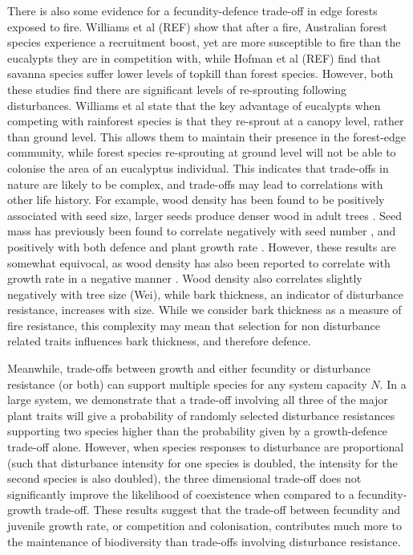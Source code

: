 \documentclass[a4paper]{article}
\begin{document}
There is also some evidence for a fecundity-defence trade-off in edge forests exposed to fire. Williams et al (REF) show that after a fire, Australian forest species experience a recruitment boost, yet are more susceptible to fire than the eucalypts they are in competition with, while Hofman et al (REF) find that savanna species suffer lower levels of topkill than forest species. However, both these studies find there are significant levels of re-sprouting following disturbances. Williams et al state that the key advantage of eucalypts when competing with rainforest species is that they re-sprout at a canopy level, rather than ground level. This allows them to maintain their presence in the forest-edge community, while forest species re-sprouting at ground level will not be able to colonise the area of an eucalyptus individual. This indicates that trade-offs in nature are likely to be complex, and trade-offs may lead to correlations with other life history. For example, wood density has been found to be positively associated with seed size, larger seeds produce denser wood in adult trees \cite{ter2001character}. Seed mass has previously been found to correlate negatively with seed number \citep{turnbull1999seed}, and positively with both defence \citep{niklas1992plant} and plant growth rate \citep{gross1984effects}. However, these results are somewhat equivocal, as wood density has also been reported to correlate with growth rate in a negative manner \citep{king2005tree}. Wood density also correlates slightly negatively with tree size (Wei), while bark thickness, an indicator of disturbance resistance, increases with size. While we consider bark thickness as a measure of fire resistance, this complexity may mean that selection for non disturbance related traits influences bark thickness, and therefore defence. 

Meanwhile, trade-offs between growth and either fecundity or disturbance resistance (or both) can support multiple species for any system capacity $N$. In a large system, we demonstrate that a trade-off involving all three of the major plant traits will give a probability of randomly selected disturbance resistances supporting two species higher than the probability given by a growth-defence trade-off alone. However, when species responses to disturbance are proportional (such that disturbance intensity for one species is doubled, the intensity for the second species is also doubled), the three dimensional trade-off does not significantly improve the likelihood of coexistence when compared to a fecundity-growth trade-off. These results suggest that the trade-off between fecundity and juvenile growth rate, or competition and colonisation, contributes much more to the maintenance of biodiversity than trade-offs involving disturbance resistance.
\end{document}
